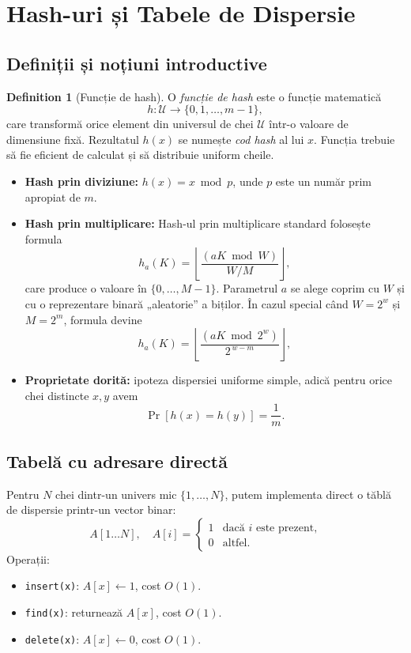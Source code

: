 \documentclass[11pt,a4paper]{article}
\theoremstyle{definition}
\newtheorem{definition}{Definition}[section]
\theoremstyle{plain}
\theoremstyle{remark}
\begin{document}
\section{Hash-uri și Tabele de Dispersie}
\label{sec:hashuri}

\subsection{Definiții și noțiuni introductive}
\begin{definition}[Funcție de hash]
O \emph{funcție de hash} este o funcție matematică
$$h: \mathcal{U} \to \{0,1,\dots,m-1\},$$
care transformă orice element din universul de chei $\mathcal{U}$ într-o valoare de dimensiune fixă. Rezultatul $h(x)$ se numește \emph{cod hash} al lui $x$. Funcția trebuie să fie eficient de calculat și să distribuie uniform cheile.
\end{definition}

\begin{itemize}
  \item \textbf{Hash prin diviziune:} $h(x) = x \bmod p$, unde $p$ este un număr prim apropiat de $m$.
  \item \textbf{Hash prin multiplicare:} Hash-ul prin multiplicare standard folosește formula
\[
  h_a(K) = \left\lfloor \frac{(aK \bmod W)}{W/M} \right\rfloor,
\]
care produce o valoare în \(\{0,\dots,M-1\}\). Parametrul \(a\) se alege coprim cu \(W\) și cu o reprezentare binară „aleatorie” a biților. În cazul special când \(W = 2^w\) și \(M = 2^m\), formula devine
\[
  h_a(K) = \left\lfloor \frac{(aK \bmod 2^w)}{2^{\,w-m}} \right\rfloor,
\]
  \item \textbf{Proprietate dorită:}\hspace{1em} ipoteza dispersiei uniforme simple, adică pentru orice chei distincte $x,y$ avem
  $$\Pr[h(x)=h(y)] = \frac{1}{m}.$$
\end{itemize}

\subsection{Tabelă cu adresare directă}
\label{subsec:adresare-directa}
Pentru $N$ chei dintr-un univers mic $\{1,\dots,N\}$, putem implementa direct o tăblă de dispersie printr-un vector binar:
\[
  A[1\dots N], \quad A[i] = \begin{cases}1 & \text{dacă }i\text{ este prezent,} \\ 0 & \text{altfel.}\end{cases}
\]
Operații:
\begin{itemize}
  \item \texttt{insert(x)}: $A[x] \leftarrow 1$, cost $O(1)$.
  \item \texttt{find(x)}: returnează $A[x]$, cost $O(1)$.
  \item \texttt{delete(x)}: $A[x] \leftarrow 0$, cost $O(1)$.
\end{itemize}
\end{document}
